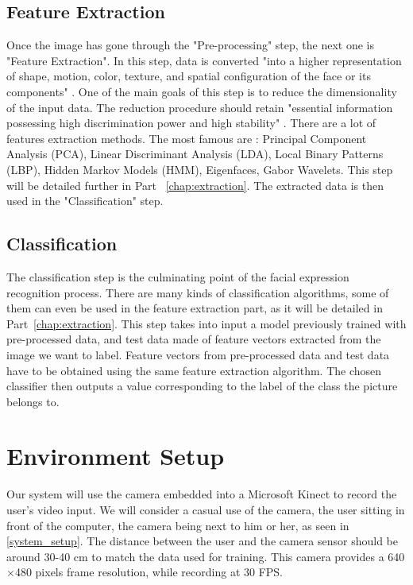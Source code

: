 \subsection{Feature Extraction}

\vspace{\baselineskip}
\noindent Once the image has gone through the "Pre-processing" step, the next one is "Feature Extraction". In this step, data is converted "into a higher representation of shape, motion, color, texture, and spatial configuration of the face or its components" \cite{CHI03}. One of the main goals of this step is to reduce the dimensionality of the input data. The reduction procedure should retain "essential information possessing high discrimination power and high stability" \cite{CHI03}. There are a lot of features extraction methods. The most famous are : Principal Component Analysis (PCA), Linear Discriminant Analysis (LDA), Local Binary Patterns (LBP), Hidden Markov Models (HMM), Eigenfaces, Gabor Wavelets. This step will be detailed further in Part ~\ref{chap:extraction}. The extracted data is then used in the "Classification" step.
\newline

\subsection{Classification}

\noindent The classification step is the culminating point of the facial expression recognition process. There are many kinds of classification algorithms, some of them can even be used in the feature extraction part, as it will be detailed in Part~\ref{chap:extraction}. This step takes into input a model previously trained with pre-processed data, and test data made of feature vectors extracted from the image we want to label. Feature vectors from pre-processed data and test data have to be obtained using the same feature extraction algorithm. The chosen classifier then outputs a value corresponding to the label of the class the picture belongs to.

\section{Environment Setup}

\vspace{\baselineskip}
\noindent Our system will use the camera embedded into a Microsoft Kinect to record the user's video input. We will consider a casual use of the camera, the user sitting in front of the computer, the camera being next to him or her, as seen in \ref{system_setup}. The distance between the user and the camera sensor should be around 30-40 cm to match the data used for training. This camera provides a 640$\times$480 pixels frame resolution, while recording at 30 FPS.
\newline


